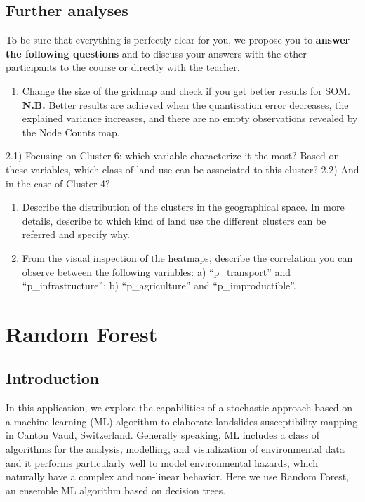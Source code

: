 \documentclass[
]{book}
\providecommand{\tightlist}{%
  \setlength{\itemsep}{0pt}\setlength{\parskip}{0pt}}
\begin{document}
\hypertarget{further-analyses}{%
\section{Further analyses}\label{further-analyses}}

To be sure that everything is perfectly clear for you, we propose you to \textbf{answer the following questions} and to discuss your answers with the other participants to the course or directly with the teacher.

\begin{enumerate}
\def\labelenumi{\arabic{enumi})}
\tightlist
\item
  Change the size of the gridmap and check if you get better results for SOM. \textbf{N.B.} Better results are achieved when the quantisation error decreases, the explained variance increases, and there are no empty observations revealed by the Node Counts map.
\end{enumerate}

2.1) Focusing on Cluster 6: which variable characterize it the most?
Based on these variables, which class of land use can be associated to this cluster?
2.2) And in the case of Cluster 4?

\begin{enumerate}
\def\labelenumi{\arabic{enumi})}
\setcounter{enumi}{2}
\item
  Describe the distribution of the clusters in the geographical space.
  In more details, describe to which kind of land use the different clusters can be referred and specify why.
\item
  From the visual inspection of the heatmaps, describe the correlation you can observe between the following variables: a) ``p\_transport'' and ``p\_infrastructure''; b) ``p\_agriculture'' and ``p\_improductible''.
\end{enumerate}

\hypertarget{random-forest}{%
\chapter{Random Forest}\label{random-forest}}

\hypertarget{introduction-4}{%
\section{Introduction}\label{introduction-4}}

In this application, we explore the capabilities of a stochastic approach based on a machine learning (ML) algorithm to elaborate landslides susceptibility mapping in Canton Vaud, Switzerland.
Generally speaking, ML includes a class of algorithms for the analysis, modelling, and visualization of environmental data and it performs particularly well to model environmental hazards, which naturally have a complex and non-linear behavior.
Here we use Random Forest, an ensemble ML algorithm based on decision trees.
\end{document}
